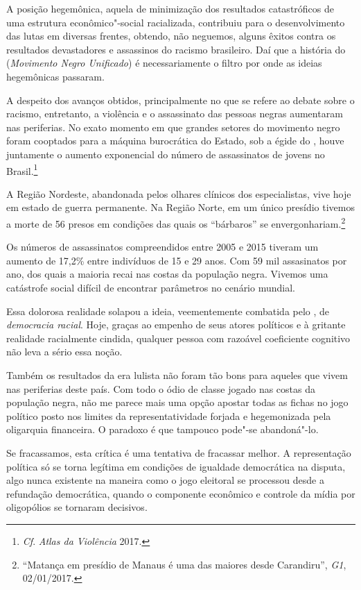 A posição hegemônica, aquela de minimização dos resultados catastróficos
de uma estrutura econômico"-social racializada, contribuiu para o
desenvolvimento das lutas em diversas frentes, obtendo, não neguemos,
alguns êxitos contra os resultados devastadores e assassinos do racismo
brasileiro. Daí que a história do  (\emph{Movimento Negro Unificado})
é necessariamente o filtro por onde as ideias hegemônicas passaram.

A despeito dos avanços obtidos, principalmente no que se refere ao
debate sobre o racismo, entretanto, a violência e o assassinato das
pessoas negras aumentaram nas periferias. No exato momento em que
grandes setores do movimento negro foram cooptados para a máquina
burocrática do Estado, sob a égide do , houve juntamente o aumento
exponencial do número de assassinatos de jovens no Brasil.\footnote{\emph{Cf}.
  \emph{Atlas da Violência} 2017.}

A Região Nordeste, abandonada
pelos olhares clínicos dos especialistas, vive hoje em estado de guerra
permanente. Na Região Norte, em um único presídio tivemos a morte de 56
presos em condições das quais os ``bárbaros'' se
envergonhariam.\footnote{``Matança em presídio de Manaus é uma das maiores
  desde Carandiru'', \emph{G1}, 02/01/2017.}

Os números de assassinatos compreendidos entre 2005 e 2015 tiveram um
aumento de 17,2\% entre indivíduos de 15 e 29 anos. Com 59 mil
assasinatos por ano, dos quais a maioria recai nas costas da população
negra. Vivemos uma catástrofe social difícil de encontrar parâmetros no
cenário mundial.

Essa dolorosa realidade solapou a ideia, veementemente combatida pelo
, de \emph{democracia racial}. Hoje, graças ao empenho de seus atores
políticos e à gritante realidade racialmente cindida, qualquer pessoa
com razoável coeficiente cognitivo não leva a sério essa noção.

Também os resultados da era lulista não foram tão bons para aqueles que
vivem nas periferias deste país. Com todo o ódio de classe jogado nas
costas da população negra, não me parece mais uma opção apostar todas as
fichas no jogo político posto nos limites da representatividade forjada
e hegemonizada pela oligarquia financeira. O paradoxo é que tampouco
pode"-se abandoná"-lo.

Se fracassamos, esta crítica é uma tentativa de fracassar melhor.
A representação política só se
torna legítima em condições de igualdade democrática na disputa, algo
nunca existente na maneira como o jogo eleitoral se processou desde a
refundação democrática, quando o componente econômico e controle da
mídia por oligopólios se tornaram decisivos.

